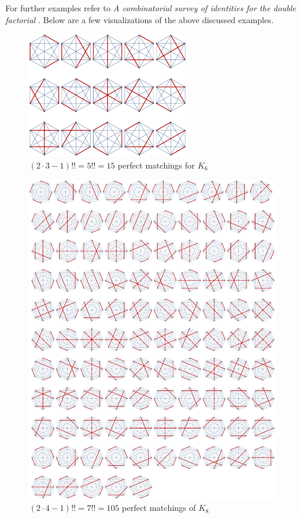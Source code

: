 \documentclass[12pt]{article}
\numberwithin{equation}{section}
\begin{document}
For further examples refer to \textit{A combinatorial survey of identities for the double factorial} \cite{callan2009combinatorial}. Below are a few visualizations of the above discussed examples.

\begin{figure}[!htb]
    \centering
    \includegraphics[width=7cm]{Images/k6matching.png}
    \caption{$(2\cdot3-1)!!=5!!=15$ perfect matchings for $K_{6}$}
    \label{fig:k6matching}
\end{figure}
\begin{figure}[!htb]
    \centering
    \includegraphics[width=11cm]{Images/newk8perfectmatching.png}
    \caption{$(2\cdot4-1)!!=7!!=105$ perfect matchings of $K_{8}$}
    \label{fig:k8matching}
\end{figure}
\clearpage
\end{document}
